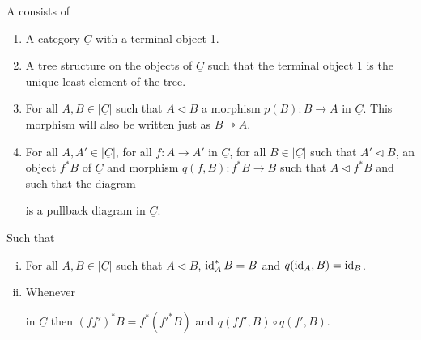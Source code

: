 \begin{definition}
  A  consists of
  \begin{enumerate}
  \item A category \(\underline{C}\) with a terminal object 1.
  \item A tree structure on the objects of \(\underline{C}\) such that the terminal object 1 is the unique least element of the tree. 
  \item For all \(A, B \in | \underline{C} |\) such that \(A \triangleleft B\) a morphism \(p(B) : B \rightarrow A\) in \(\underline{C}\). This morphism will also be written just as \(B \rightarrowtriangle A\).
  \item For all \(A, A' \in |\underline C |\), for all \(f:A \rightarrow A'\) in \(\underline{C}\), for all \(B \in |\underline C |\) such that \(A' \triangleleft B\), an object \(f^*B\) of \(\underline C\) and morphism \(q(f,B) : f^*B \rightarrow B\) such that \(A \triangleleft f^*B\) and such that the diagram
    \begin{center}
    \end{center}

    is a pullback diagram in \(\underline C\).
  \end{enumerate}

  Such that
  \begin{enumerate}[(i)]
    \item For all \(A, B \in | \underline C|\) such that \(A \triangleleft B\), \(\operatorname{id}_A^*B = B\) and \(q(\operatorname{id}_A,B) = \operatorname{id}_B\).
    \item Whenever
      \begin{center}
      \end{center}
      in \(\underline C\) then \((ff')^*B = f^*(f'^*B)\) and \(q(ff',B) \circ q(f',B)\).
  \end{enumerate}
\end{definition}
%
